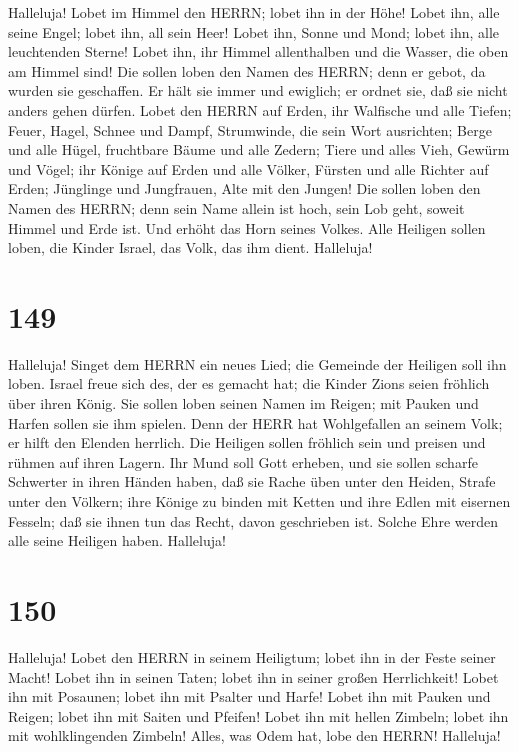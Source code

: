  Halleluja! Lobet im Himmel den HERRN; lobet ihn in der
Höhe!  Lobet ihn, alle seine Engel; lobet ihn, all sein
Heer!  Lobet ihn, Sonne und Mond; lobet ihn, alle
leuchtenden Sterne!  Lobet ihn, ihr Himmel allenthalben und
die Wasser, die oben am Himmel sind!  Die sollen loben den
Namen des HERRN; denn er gebot, da wurden sie geschaffen. 
Er hält sie immer und ewiglich; er ordnet sie, daß sie nicht anders
gehen dürfen.  Lobet den HERRN auf Erden, ihr Walfische und
alle Tiefen;  Feuer, Hagel, Schnee und Dampf, Strumwinde,
die sein Wort ausrichten;  Berge und alle Hügel, fruchtbare
Bäume und alle Zedern;  Tiere und alles Vieh, Gewürm und
Vögel;  ihr Könige auf Erden und alle Völker, Fürsten und
alle Richter auf Erden;  Jünglinge und Jungfrauen, Alte mit
den Jungen!  Die sollen loben den Namen des HERRN; denn
sein Name allein ist hoch, sein Lob geht, soweit Himmel und Erde ist.
 Und erhöht das Horn seines Volkes. Alle Heiligen sollen
loben, die Kinder Israel, das Volk, das ihm dient. Halleluja!

\hypertarget{section-148}{%
\section{149}\label{section-148}}

 Halleluja! Singet dem HERRN ein neues Lied; die Gemeinde
der Heiligen soll ihn loben.  Israel freue sich des, der es
gemacht hat; die Kinder Zions seien fröhlich über ihren König.
 Sie sollen loben seinen Namen im Reigen; mit Pauken und
Harfen sollen sie ihm spielen.  Denn der HERR hat
Wohlgefallen an seinem Volk; er hilft den Elenden herrlich. 
Die Heiligen sollen fröhlich sein und preisen und rühmen auf ihren
Lagern.  Ihr Mund soll Gott erheben, und sie sollen scharfe
Schwerter in ihren Händen haben,  daß sie Rache üben unter
den Heiden, Strafe unter den Völkern;  ihre Könige zu binden
mit Ketten und ihre Edlen mit eisernen Fesseln;  daß sie
ihnen tun das Recht, davon geschrieben ist. Solche Ehre werden alle
seine Heiligen haben. Halleluja!

\hypertarget{section-149}{%
\section{150}\label{section-149}}

 Halleluja! Lobet den HERRN in seinem Heiligtum; lobet ihn
in der Feste seiner Macht!  Lobet ihn in seinen Taten; lobet
ihn in seiner großen Herrlichkeit!  Lobet ihn mit Posaunen;
lobet ihn mit Psalter und Harfe!  Lobet ihn mit Pauken und
Reigen; lobet ihn mit Saiten und Pfeifen!  Lobet ihn mit
hellen Zimbeln; lobet ihn mit wohlklingenden Zimbeln! 
Alles, was Odem hat, lobe den HERRN! Halleluja!
